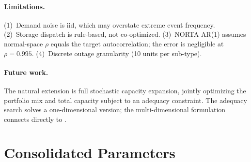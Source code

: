 \documentclass[11pt]{article}
\begin{document}
\paragraph{Limitations.}
(1)~Demand noise is iid, which may overstate extreme event frequency.
(2)~Storage dispatch is rule-based, not co-optimized.
(3)~NORTA AR(1) assumes normal-space $\rho$ equals the target autocorrelation; the error is negligible at $\rho = 0.995$.
(4)~Discrete outage granularity (10 units per sub-type).

\paragraph{Future work.}
The natural extension is full stochastic capacity expansion, jointly optimizing the portfolio mix and total capacity subject to an adequacy constraint. The adequacy search solves a one-dimensional version; the multi-dimensional formulation connects directly to \citet{ParkBaldick2016}.




\appendix

\section{Consolidated Parameters}\label{app:params}
\end{document}
